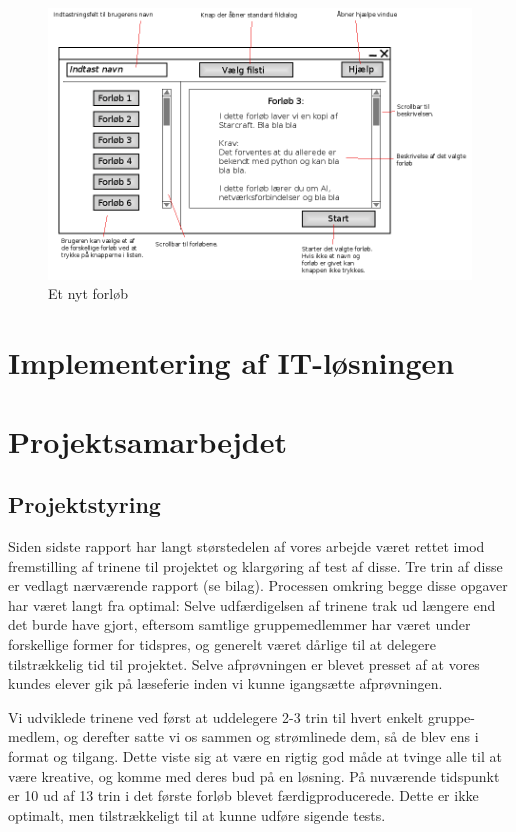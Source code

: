 \documentclass[10pt,a4paper,danish]{article}
\begin{document}
\begin{figure}[h]
  \begin{center}
    \includegraphics[scale=0.4]{nytforloeb.png}
    \caption{Et nyt forløb}
    \label{fig:nytforloeb}
  \end{center}
\end{figure}
\newpage



\section{Implementering af IT-løsningen}




\section{Projektsamarbejdet}
\subsection{Projektstyring}
Siden sidste rapport har langt størstedelen af vores arbejde været rettet imod
fremstilling af trinene til projektet og klargøring af test af disse. Tre trin
af disse er vedlagt nærværende rapport (se bilag). Processen
omkring begge disse opgaver har været langt fra optimal: Selve udfærdigelsen af 
trinene trak ud længere end det burde have gjort, eftersom samtlige gruppemedlemmer
har været under forskellige former for tidspres, og generelt været dårlige til 
at delegere tilstrækkelig tid til projektet. Selve afprøvningen er blevet presset
af at vores kundes elever gik på læseferie inden vi kunne igangsætte afprøvningen. 

Vi udviklede trinene ved først at uddelegere 2-3 trin til hvert enkelt gruppe-
medlem, og derefter satte vi os sammen og strømlinede dem, så de blev ens i
format og tilgang. Dette viste sig at være en rigtig god måde at tvinge alle
til at være kreative, og komme med deres bud på en løsning. På nuværende tidspunkt
er 10 ud af 13 trin i det første forløb blevet færdigproducerede. Dette er ikke 
optimalt, men tilstrækkeligt til at kunne udføre sigende tests.
\end{document}
